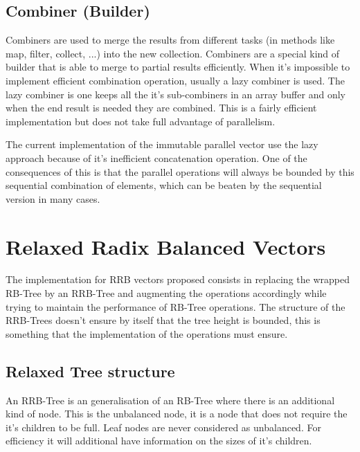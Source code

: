 
\subsection{Combiner (Builder)}
Combiners are used to merge the results from different tasks (in methods like map, filter, collect, ...) into the new collection. Combiners are a special kind of builder that is able to merge to partial results efficiently. When it's impossible to implement efficient combination operation, usually a lazy combiner is used. The lazy combiner is one keeps all the it's sub-combiners in an array buffer and only when the end result is needed they are combined. This is a fairly efficient implementation but does not take full advantage of parallelism. 

The current implementation of the immutable parallel vector \cite{scalaParVector211} use the lazy approach because of it's inefficient concatenation operation. One of the consequences of this is that the parallel operations will always be bounded by this sequential combination of elements, which can be beaten by the sequential version in many cases.
 


\section{Relaxed Radix Balanced Vectors}

The implementation for RRB vectors proposed consists in replacing the wrapped RB-Tree by an RRB-Tree and augmenting the operations accordingly while trying to maintain the performance of RB-Tree operations. The structure of the RRB-Trees doesn't ensure by itself that the tree height is bounded, this is something that the implementation of the operations must ensure. 


\subsection{Relaxed Tree structure}
An RRB-Tree is an generalisation of an RB-Tree where there is an additional kind of node. This is the unbalanced node, it is a node that does not require the it's children to be full. Leaf nodes are never considered as unbalanced. For efficiency it will additional have information on the sizes of it's children.

